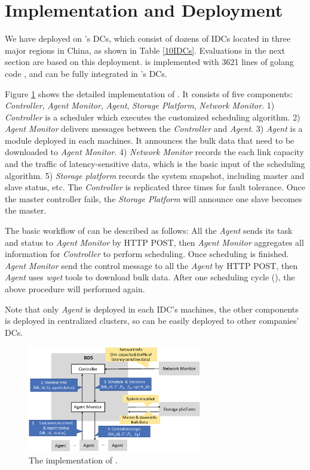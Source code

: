 \section{Implementation and Deployment}
We have deployed \name on \company's DCs, which consist of dozens of IDCs located in three major regions in China, as shown in Table \ref{10IDCs}. Evaluations in the next section are based on this deployment.
 \name is implemented with 3621 lines of golang code \cite{golang}, and can be fully integrated in \company's DCs.

Figure \ref{fig:implementation} shows the detailed implementation of \name. It  consists of five components: \emph{Controller}, \emph{Agent Monitor}, \emph{Agent}, \emph{Storage Platform}, \emph{Network Monitor}. 1) \emph{Controller} is a scheduler which executes the customized scheduling algorithm. 2) \emph{Agent Monitor} delivers messages between the \emph{Controller} and \emph{Agent}. 3) \emph{Agent} is a module deployed in each machines. It announces the bulk data that need to be downloaded to \emph{Agent Monitor}. 4) \emph{Network Monitor} records the each link capacity and the traffic of latency-sensitive data, which is the basic input of the scheduling algorithm. 5) \emph{Storage platform} records the system snapshot, including master and slave status, etc. The \emph{Controller} is replicated three times for fault tolerance. Once the master controller fails, the \emph{Storage Platform} will announce one slave becomes the master.

The basic workflow of \name can be described as follows: All the \emph{Agent} sends its task and status to \emph{Agent Monitor} by HTTP POST, then \emph{Agent Monitor} aggregates all information for \emph{Controller} to perform scheduling. Once scheduling is finished. \emph{Agent Monitor} send the control message to all the \emph{Agent} by HTTP POST, then \emph{Agent} uses \emph{wget} tools to download bulk data. After one scheduling cycle (\fillme), the above procedure will performed again.

Note that only \emph{Agent} is deployed in each IDC's machines, the other components is deployed in centralized clusters, so \name can be easily deployed to other companies' DCs. 	
\begin{figure}[htbp]
  \centering
  \includegraphics[width=3in]{images/implementation.eps}
  \caption{The implementation of \name.}
  \label{fig:implementation}
\end{figure}
\vspace{-15pt}


